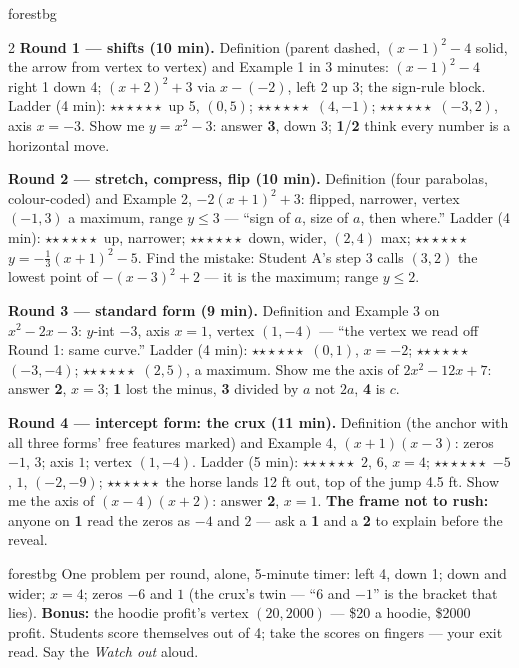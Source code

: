 \documentclass[10pt]{article}
\newcommand{\rung}[1]{{\color{goldacc}\ifcase#1\or$\star$\or$\star\star$\or$\star\star\star$\fi}}
\begin{document}
\begin{skillbox}{forestbg}
\begin{multicols}{2}
\textbf{Round 1 --- shifts (10 min).} Definition (parent dashed, $(x-1)^2-4$ solid, the arrow
from vertex to vertex) and Example 1 in 3 minutes: $(x-1)^2-4$ right 1 down 4; $(x+2)^2+3$ via
$x-(-2)$, left 2 up 3; the sign-rule block. Ladder (4 min): \rung1\ up 5, $(0,5)$;
\rung2\ $(4,-1)$; \rung3\ $(-3,2)$, axis $x=-3$. Show me $y=x^2-3$: answer \textbf{3}, down 3;
\textbf{1}/\textbf{2} think every number is a horizontal move.

\textbf{Round 2 --- stretch, compress, flip (10 min).} Definition (four parabolas, colour-coded)
and Example 2, $-2(x+1)^2+3$: flipped, narrower, vertex $(-1,3)$ a maximum, range $y\le3$ ---
``sign of $a$, size of $a$, then where.'' Ladder (4 min): \rung1\ up, narrower;
\rung2\ down, wider, $(2,4)$ max; \rung3\ $y=-\frac13(x+1)^2-5$. Find the mistake: Student A's
step 3 calls $(3,2)$ the lowest point of $-(x-3)^2+2$ --- it is the maximum; range $y\le2$.

\columnbreak
\textbf{Round 3 --- standard form (9 min).} Definition and Example 3 on $x^2-2x-3$: $y$-int
$-3$, axis $x=1$, vertex $(1,-4)$ --- ``the vertex we read off Round 1: same curve.'' Ladder
(4 min): \rung1\ $(0,1)$, $x=-2$; \rung2\ $(-3,-4)$; \rung3\ $(2,5)$, a maximum. Show me the
axis of $2x^2-12x+7$: answer \textbf{2}, $x=3$; \textbf{1} lost the minus, \textbf{3} divided
by $a$ not $2a$, \textbf{4} is $c$.

\textbf{Round 4 --- intercept form: the crux (11 min).} Definition (the anchor with all three
forms' free features marked) and Example 4, $(x+1)(x-3)$: zeros $-1$, $3$; axis $1$; vertex
$(1,-4)$. Ladder (5 min): \rung1\ $2$, $6$, $x=4$; \rung2\ $-5$, $1$, $(-2,-9)$;
\rung3\ the horse lands 12 ft out, top of the jump 4.5 ft. Show me the axis of $(x-4)(x+2)$:
answer \textbf{2}, $x=1$. \textbf{The frame not to rush:} anyone on \textbf{1} read the zeros as
$-4$ and $2$ --- ask a \textbf{1} and a \textbf{2} to explain before the reveal.
\end{multicols}
\end{skillbox}

\boxguard
\begin{skillbox}{forestbg}
One problem per round, alone, 5-minute timer: left 4, down 1; down and wider; $x=4$; zeros $-6$
and $1$ (the crux's twin --- ``$6$ and $-1$'' is the bracket that lies). \textbf{Bonus:} the
hoodie profit's vertex $(20,2000)$ --- \$20 a hoodie, \$2000 profit. Students score themselves
out of 4; take the scores on fingers --- your exit read. Say the \emph{Watch out} aloud.
\end{skillbox}
\end{document}
